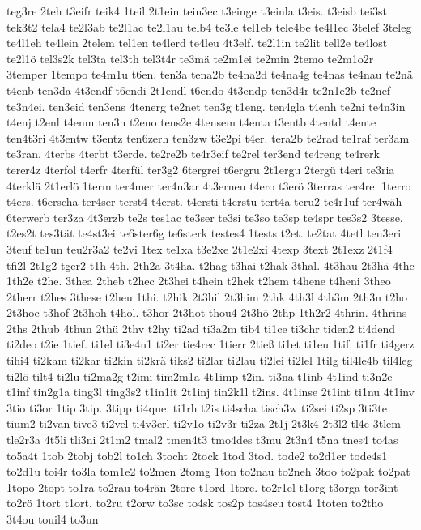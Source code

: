 {teg3re
2teh
t3eifr
teik4
1teil
2t1ein
tein3ec
t3einge
t3einla
t3eis.
t3eisb
tei3st
tek3t2
tela4
te2l3ab
te2l1ac
te2l1au
telb4
te3le
tel1eb
tele4be
te4l1ec
3telef
3teleg
te4l1eh
te4lein
2telem
tel1en
te4lerd
te4leu
4t3elf.
te2l1in
te2lit
tell2e
te4lost
te2l1ö
tel3s2k
tel3ta
tel3th
tel3t4r
te3mä
te2m1ei
te2min
2temo
te2m1o2r
3temper
1tempo
te4m1u
t6en.
ten3a
tena2b
te4na2d
te4na4g
te4nas
te4nau
te2nä
t4enb
ten3da
4t3endf
t6endi
2t1endl
t6endo
4t3endp
ten3d4r
te2n1e2b
te2nef
te3n4ei.
ten3eid
ten3ens
4tenerg
te2net
ten3g
t1eng.
ten4gla
t4enh
te2ni
te4n3in
t4enj
t2enl
t4enm
ten3n
t2eno
tens2e
4tensem
t4enta
t3entb
4tentd
t4ente
ten4t3ri
4t3entw
t3entz
ten6zerh
ten3zw
t3e2pi
t4er.
tera2b
te2rad
te1raf
ter3am
te3ran.
4terbs
4terbt
t3erde.
te2re2b
te4r3eif
te2rel
ter3end
te4reng
te4rerk
terer4z
4terfol
t4erfr
4terfül
ter3g2
6tergrei
t6ergru
2t1ergu
2tergü
t4eri
te3ria
4terklä
2t1erlö
1term
ter4mer
ter4n3ar
4t3erneu
t4ero
t3erö
3terras
ter4re.
1terro
t4ers.
t6erscha
ter4ser
terst4
t4erst.
t4ersti
t4erstu
tert4a
teru2
te4r1uf
ter4wäh
6terwerb
ter3za
4t3erzb
te2s
tes1ac
te3ser
te3si
te3so
te3sp
te4spr
tes3s2
3tesse.
t2es2t
tes3tät
te4st3ei
te6ster6g
te6sterk
testes4
1tests
t2et.
te2tat
4tetl
teu3eri
3teuf
te1un
teu2r3a2
te2vi
1tex
te1xa
t3e2xe
2t1e2xi
4texp
3text
2t1exz
2t1f4
tfi2l
2t1g2
tger2
t1h
4th.
2th2a
3t4ha.
t2hag
t3hai
t2hak
3thal.
4t3hau
2t3hä
4thc
1th2e
t2he.
3thea
2theb
t2hec
2t3hei
t4hein
t2hek
t2hem
t4hene
t4heni
3theo
2therr
t2hes
3these
t2heu
1thi.
t2hik
2t3hil
2t3him
2thk
4th3l
4th3m
2th3n
t2ho
2t3hoc
t3hof
2t3hoh
t4hol.
t3hor
2t3hot
thou4
2t3hö
2thp
1th2r2
4thrin.
4thrins
2ths
2thub
4thun
2thü
2thv
t2hy
ti2ad
ti3a2m
tib4
ti1ce
ti3chr
tiden2
ti4dend
ti2deo
t2ie
1tief.
ti1el
ti3e4n1
ti2er
tie4rec
1tierr
2tieß
ti1et
ti1eu
1tif.
ti1fr
ti4gerz
tihi4
ti2kam
ti2kar
ti2kin
ti2krä
tiks2
ti2lar
ti2lau
ti2lei
ti2lel
1tilg
til4le4b
til4leg
ti2lö
tilt4
ti2lu
ti2ma2g
t2imi
tim2m1a
4t1imp
t2in.
ti3na
t1inb
4t1ind
ti3n2e
t1inf
tin2g1a
ting3l
ting3s2
t1in1it
2t1inj
tin2k1l
t2ins.
4t1inse
2t1int
ti1nu
4t1inv
3tio
ti3or
1tip
3tip.
3tipp
ti4que.
ti1rh
t2is
ti4scha
tisch3w
ti2sei
ti2sp
3ti3te
tium2
ti2van
tive3
ti2vel
ti4v3erl
ti2v1o
ti2v3r
ti2za
2t1j
2t3k4
2t3l2
tl4e
3tlem
tle2r3a
4t5li
tli3ni
2t1m2
tmal2
tmen4t3
tmo4des
t3mu
2t3n4
t5na
tnes4
to4as
to5a4t
1tob
2tobj
tob2l
to1ch
3tocht
2tock
1tod
3tod.
tode2
to2d1er
tode4s1
to2d1u
toi4r
to3la
tom1e2
to2men
2tomg
1ton
to2nau
to2neh
3too
to2pak
to2pat
1topo
2topt
to1ra
to2rau
to4rän
2torc
t1ord
1tore.
to2r1el
t1org
t3orga
tor3int
to2rö
1tort
t1ort.
to2ru
t2orw
to3sc
to4sk
tos2p
tos4seu
tost4
1toten
to2tho
3t4ou
touil4
to3un
}
